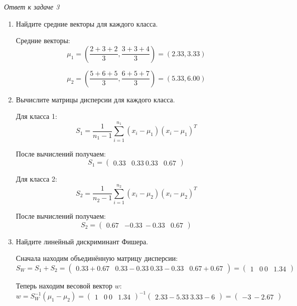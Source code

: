 \textit{Ответ к задаче 3}
\begin{enumerate}
    \item Найдите средние векторы для каждого класса.

    Средние векторы:
    \[
    \mu_1 = \left(\frac{2+3+2}{3}, \frac{3+3+4}{3}\right) = \left(2.33, 3.33\right)
    \]

    \[
    \mu_2 = \left(\frac{5+6+5}{3}, \frac{6+5+7}{3}\right) = \left(5.33, 6.00\right)
    \]

    \item Вычислите матрицы дисперсии для каждого класса.

    Для класса 1:
    \[
    S_1 = \frac{1}{n_1-1} \sum_{i=1}^{n_1} (x_i - \mu_1)(x_i - \mu_1)^T
    \]

    После вычислений получаем:
    \[
    S_1 = \begin{pmatrix}
        0.33 & 0.33 \
        0.33 & 0.67
    \end{pmatrix}
    \]

    Для класса 2:
    \[
    S_2 = \frac{1}{n_2-1} \sum_{i=1}^{n_2} (x_i - \mu_2)(x_i - \mu_2)^T
    \]

    После вычислений получаем:
    \[
    S_2 = \begin{pmatrix}
        0.67 & -0.33 \
        -0.33 & 0.67
    \end{pmatrix}
    \]

    \item Найдите линейный дискриминант Фишера.

    Сначала находим объединённую матрицу дисперсии:
    \[
    S_W = S_1 + S_2 =
    \begin{pmatrix}
        0.33 + 0.67 & 0.33 - 0.33 \
        0.33 - 0.33 & 0.67 + 0.67
    \end{pmatrix}
    =
    \begin{pmatrix}
        1 & 0 \
        0 & 1.34
    \end{pmatrix}
    \]

    Теперь находим весовой вектор $w$:
    \[
    w = S_W^{-1}(\mu_1 - \mu_2) =
    \begin{pmatrix}
        1 & 0 \
        0 & 1.34
    \end{pmatrix}^{-1}
    \begin{pmatrix}
        2.33 - 5.33 \
        3.33 - 6
    \end{pmatrix}
    =
    \begin{pmatrix}
        -3 \
        -2.67
    \end{pmatrix}
    \]
\end{enumerate}

